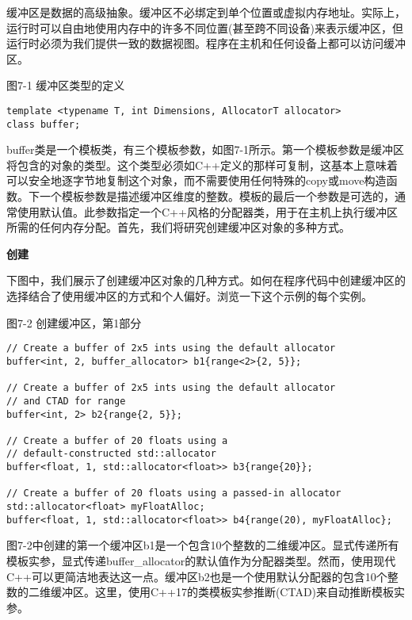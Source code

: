 缓冲区是数据的高级抽象。缓冲区不必绑定到单个位置或虚拟内存地址。实际上，运行时可以自由地使用内存中的许多不同位置(甚至跨不同设备)来表示缓冲区，但运行时必须为我们提供一致的数据视图。程序在主机和任何设备上都可以访问缓冲区。\par

\hspace*{\fill} \par %
图7-1 缓冲区类型的定义
\begin{lstlisting}[caption={}]
template <typename T, int Dimensions, AllocatorT allocator>
class buffer;
\end{lstlisting}

buffer类是一个模板类，有三个模板参数，如图7-1所示。第一个模板参数是缓冲区将包含的对象的类型。这个类型必须如C++定义的那样可复制，这基本上意味着可以安全地逐字节地复制这个对象，而不需要使用任何特殊的copy或move构造函数。下一个模板参数是描述缓冲区维度的整数。模板的最后一个参数是可选的，通常使用默认值。此参数指定一个C++风格的分配器类，用于在主机上执行缓冲区所需的任何内存分配。首先，我们将研究创建缓冲区对象的多种方式。\par

\hspace*{\fill} \par %
\textbf{创建}

下图中，我们展示了创建缓冲区对象的几种方式。如何在程序代码中创建缓冲区的选择结合了使用缓冲区的方式和个人偏好。浏览一下这个示例的每个实例。\par

\hspace*{\fill} \par %
图7-2 创建缓冲区，第1部分
\begin{lstlisting}[caption={}]
// Create a buffer of 2x5 ints using the default allocator
buffer<int, 2, buffer_allocator> b1{range<2>{2, 5}};

// Create a buffer of 2x5 ints using the default allocator 
// and CTAD for range
buffer<int, 2> b2{range{2, 5}};

// Create a buffer of 20 floats using a 
// default-constructed std::allocator
buffer<float, 1, std::allocator<float>> b3{range{20}};

// Create a buffer of 20 floats using a passed-in allocator
std::allocator<float> myFloatAlloc;
buffer<float, 1, std::allocator<float>> b4{range(20), myFloatAlloc};
\end{lstlisting}

图7-2中创建的第一个缓冲区b1是一个包含10个整数的二维缓冲区。显式传递所有模板实参，显式传递buffer\_allocator的默认值作为分配器类型。然而，使用现代C++可以更简洁地表达这一点。缓冲区b2也是一个使用默认分配器的包含10个整数的二维缓冲区。这里，使用C++17的类模板实参推断(CTAD)来自动推断模板实参。\par

